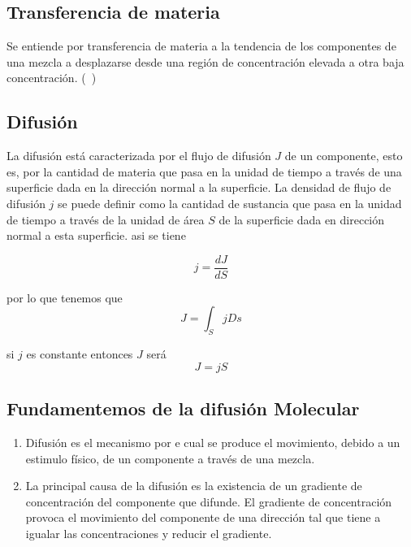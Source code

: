 \subsection{Transferencia de materia}
Se entiende por transferencia de materia a la tendencia de los
componentes de una mezcla a desplazarse desde una región de concentración
elevada a otra baja concentración. (~\cite{rod:2017})

\subsection{Difusión}
La difusión está caracterizada por el flujo
de difusión $J$ de un componente, esto es, por la
cantidad de materia que pasa en la unidad
de tiempo a través de una superficie dada en la dirección
normal a la superficie.
La densidad de flujo de difusión $j$
se puede definir como la cantidad de sustancia que
pasa en la unidad de tiempo a través de la unidad de área $S$
de la superficie dada en dirección normal a esta superficie.
asi se tiene

\begin{equation}
    \label{eq:densidad:flujo}
    j = \frac{dJ}{dS}
\end{equation}

por lo que tenemos que
\begin{equation}
    J = \int_S jDs
\end{equation}

si $j$ es constante entonces $J$ será
\begin{equation}
    J = jS
\end{equation}

\subsection{Fundamentemos de la difusión Molecular}
\begin{enumerate}
    \item Difusión es el mecanismo por e cual se produce el movimiento,
    debido a un estimulo físico, de un componente a través de una 
    mezcla.

    \item La principal causa de la difusión es la existencia de un gradiente de 
    concentración del componente que difunde. El gradiente de concentración provoca
    el movimiento del componente de una dirección tal que tiene a igualar las concentraciones y reducir el gradiente.
\end{enumerate}

